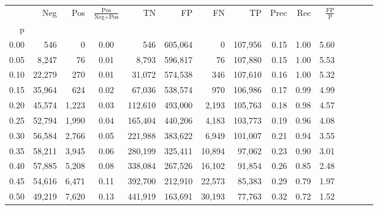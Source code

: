 \begin{tabular}{rrrcrrrrrrrrrrr}
\toprule
{} &     Neg &    Pos & $\frac{\text{Pos}}{\text{Neg}+\text{Pos}}$ &       TN &       FP &       FN &       TP &  Prec &   Rec & $\frac{\text{FP}}{\text{P}}$ \\
p    &         &        &                                            &          &          &          &          &       &       &                              \\
\midrule
0.00 &     546 &      0 &                                       0.00 &      546 &  605,064 &        0 &  107,956 &  0.15 &  1.00 &                         5.60 \\
0.05 &   8,247 &     76 &                                       0.01 &    8,793 &  596,817 &       76 &  107,880 &  0.15 &  1.00 &                         5.53 \\
0.10 &  22,279 &    270 &                                       0.01 &   31,072 &  574,538 &      346 &  107,610 &  0.16 &  1.00 &                         5.32 \\
0.15 &  35,964 &    624 &                                       0.02 &   67,036 &  538,574 &      970 &  106,986 &  0.17 &  0.99 &                         4.99 \\
0.20 &  45,574 &  1,223 &                                       0.03 &  112,610 &  493,000 &    2,193 &  105,763 &  0.18 &  0.98 &                         4.57 \\
0.25 &  52,794 &  1,990 &                                       0.04 &  165,404 &  440,206 &    4,183 &  103,773 &  0.19 &  0.96 &                         4.08 \\
0.30 &  56,584 &  2,766 &                                       0.05 &  221,988 &  383,622 &    6,949 &  101,007 &  0.21 &  0.94 &                         3.55 \\
0.35 &  58,211 &  3,945 &                                       0.06 &  280,199 &  325,411 &   10,894 &   97,062 &  0.23 &  0.90 &                         3.01 \\
0.40 &  57,885 &  5,208 &                                       0.08 &  338,084 &  267,526 &   16,102 &   91,854 &  0.26 &  0.85 &                         2.48 \\
0.45 &  54,616 &  6,471 &                                       0.11 &  392,700 &  212,910 &   22,573 &   85,383 &  0.29 &  0.79 &                         1.97 \\
0.50 &  49,219 &  7,620 &                                       0.13 &  441,919 &  163,691 &   30,193 &   77,763 &  0.32 &  0.72 &                         1.52 \\

\end{tabular}
